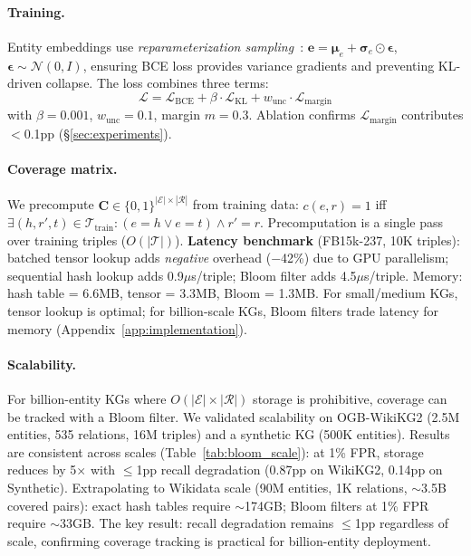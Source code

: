 \paragraph{Training.}
Entity embeddings use \emph{reparameterization sampling}~\citep{kingma2014autoencoding}: $\mathbf{e} = \boldsymbol{\mu}_e + \boldsymbol{\sigma}_e \odot \boldsymbol{\epsilon}$, $\boldsymbol{\epsilon} \sim \mathcal{N}(0, I)$, ensuring BCE loss provides variance gradients and preventing KL-driven collapse. The loss combines three terms:
\begin{equation}
\mathcal{L} = \mathcal{L}_{\text{BCE}} + \beta \cdot \mathcal{L}_{\text{KL}} + w_{\text{unc}} \cdot \mathcal{L}_{\text{margin}}
\label{eq:loss}
\end{equation}
with $\beta{=}0.001$, $w_{\text{unc}}{=}0.1$, margin $m{=}0.3$. Ablation confirms $\mathcal{L}_{\text{margin}}$ contributes $<$0.1pp (\S\ref{sec:experiments}).

\paragraph{Coverage matrix.}
We precompute $\mathbf{C} \in \{0,1\}^{|\mathcal{E}| \times |\mathcal{R}|}$ from training data:
$c(e,r) = 1$ iff $\exists (h,r',t) \in \mathcal{T}_{\text{train}}: (e{=}h \lor e{=}t) \land r'{=}r$.
Precomputation is a single pass over training triples ($O(|\mathcal{T}|)$). \textbf{Latency benchmark} (FB15k-237, 10K triples): batched tensor lookup adds \emph{negative} overhead ($-$42\%) due to GPU parallelism; sequential hash lookup adds 0.9$\mu$s/triple; Bloom filter adds 4.5$\mu$s/triple. Memory: hash table = 6.6MB, tensor = 3.3MB, Bloom = 1.3MB. For small/medium KGs, tensor lookup is optimal; for billion-scale KGs, Bloom filters trade latency for memory (Appendix~\ref{app:implementation}).

\paragraph{Scalability.}
For billion-entity KGs where $O(|\mathcal{E}| \times |\mathcal{R}|)$ storage is prohibitive, coverage can be tracked with a Bloom filter. We validated scalability on OGB-WikiKG2 (2.5M entities, 535 relations, 16M triples) and a synthetic KG (500K entities). Results are consistent across scales (Table~\ref{tab:bloom_scale}): at 1\% FPR, storage reduces by 5$\times$ with $\leq$1pp recall degradation (0.87pp on WikiKG2, 0.14pp on Synthetic). Extrapolating to Wikidata scale (90M entities, 1K relations, $\sim$3.5B covered pairs): exact hash tables require $\sim$174GB; Bloom filters at 1\% FPR require $\sim$33GB. The key result: recall degradation remains $\leq$1pp regardless of scale, confirming coverage tracking is practical for billion-entity deployment.

